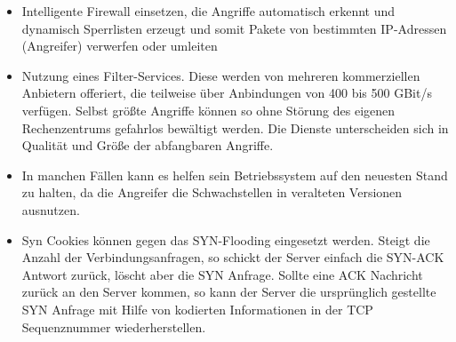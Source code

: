 \begin{itemize}
	\item Intelligente Firewall einsetzen, die Angriffe automatisch erkennt und dynamisch Sperrlisten erzeugt und somit Pakete von bestimmten IP-Adressen (Angreifer) verwerfen oder umleiten
	\item Nutzung eines Filter-Services. Diese werden von mehreren kommerziellen Anbietern offeriert, die teilweise über Anbindungen von 400 bis 500 GBit/s verfügen. Selbst größte Angriffe können so ohne Störung des eigenen Rechenzentrums gefahrlos bewältigt werden. Die Dienste unterscheiden sich in Qualität und Größe der abfangbaren Angriffe. 
	\item In manchen Fällen kann es helfen sein Betriebssystem auf den neuesten Stand zu halten, da die Angreifer die Schwachstellen in veralteten Versionen ausnutzen.
	\item Syn Cookies können gegen das SYN-Flooding eingesetzt werden. Steigt die Anzahl der Verbindungsanfragen, so schickt der Server einfach die SYN-ACK Antwort zurück, löscht aber die SYN Anfrage. Sollte eine ACK Nachricht zurück an den Server kommen, so kann der Server die ursprünglich gestellte SYN Anfrage mit Hilfe von kodierten Informationen in der TCP Sequenznummer wiederherstellen.  
\end{itemize}




